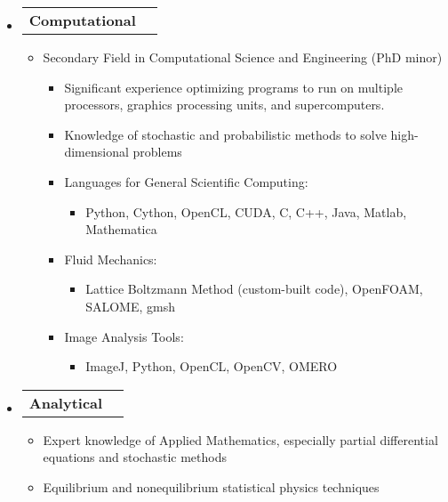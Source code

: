 \documentclass[letterpaper,11pt]{article}
\makeatletter
\newcommand{\resitem}[1]{\item #1 \vspace{-2pt}}
\newcommand{\award}[2]{\vspace{-5pt}
\begin{tabular*}{7.0in}{l@{\extracolsep{\fill}}r}
                \textbf{#1} & #2 
\end{tabular*}\vspace{-8pt}}
\makeatother
\begin{document}
\begin{itemize}

\item \award{Computational}{}

\begin{itemize}

\resitem{Secondary Field in Computational Science and Engineering (PhD minor)}
        \begin{itemize}
        \resitem{Significant experience optimizing programs to run on multiple processors, graphics processing units, and supercomputers.}
        
        \resitem{Knowledge of stochastic and probabilistic methods to solve high-dimensional problems}
        \end{itemize}


\begin{itemize}

        \resitem{Languages for General Scientific Computing:} 
                \begin{itemize}
                \resitem{Python, Cython, OpenCL, CUDA, C, C++, Java, Matlab, Mathematica}
                \end{itemize}
        
        \resitem{Fluid Mechanics:}
                \begin{itemize}
                \resitem{Lattice Boltzmann Method (custom-built code), OpenFOAM, SALOME, gmsh}
                \end{itemize}        
        \resitem{Image Analysis Tools:}
                \begin{itemize}
                \resitem{ImageJ, Python, OpenCL, OpenCV, OMERO}
                \end{itemize}
              
\end{itemize}

\end{itemize}

\item \award{Analytical}{}
\begin{itemize}
        \resitem{Expert knowledge of Applied Mathematics, especially partial differential equations and stochastic methods}
        \resitem{Equilibrium and nonequilibrium statistical physics techniques}




\end{itemize}

\end{itemize}
\end{document}

